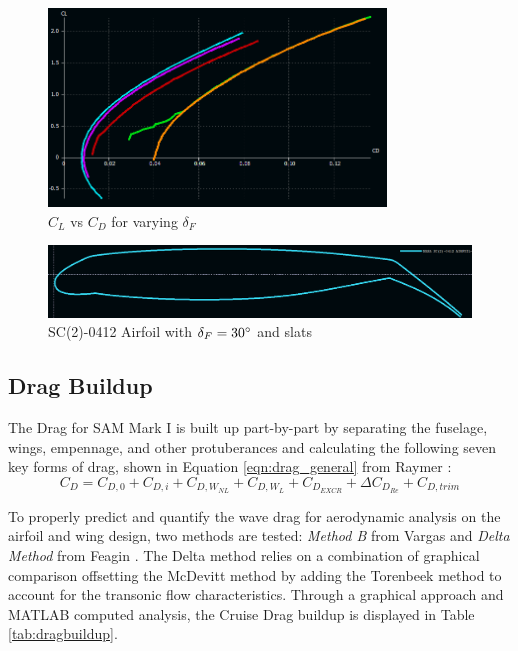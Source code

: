 \begin{figure}[!h]
    \centering
    \includegraphics[width=0.8\textwidth]{Photos/aero/CL_o_CD.png}
    \caption{$C_L$ vs $C_D$ for varying $\delta_F$}
    \label{fig:clcdhigh}
\end{figure}

\begin{figure}[!h]
    \centering
    \includegraphics[width=\textwidth]{Photos/aero/sc0412flapped.png}
    \caption{SC(2)-0412 Airfoil with $\delta_F = 30\degree$ and slats}
    \label{fig:highlift}
\end{figure}

\clearpage
\subsection{Drag Buildup}
The Drag for SAM Mark I is built up part-by-part by separating the fuselage, wings, empennage, and other protuberances and calculating the following seven key forms of drag, shown in Equation \ref{eqn:drag_general} from Raymer \cite{raymer}:
\begin{equation}\label{eqn:drag_general}
    C_D = C_{D,0} + C_{D,i} + C_{D,W_{NL}} + C_{D,W_{L}} + C_{D_{EXCR}} + \Delta C_{D_{Re}} + C_{D,trim}
\end{equation}




To properly predict and quantify the wave drag for aerodynamic analysis on the airfoil and wing design, two methods are tested: \textit{Method B} from Vargas \cite{vargas} and \textit{Delta Method} from Feagin \cite{deltaMethod}.  The Delta method relies on a combination of graphical comparison offsetting the McDevitt method \cite{mcdevitt} by adding the Torenbeek method \cite{torenbeek} to account for the transonic flow characteristics.  Through a graphical approach and MATLAB computed analysis, the Cruise Drag buildup is displayed in Table \ref{tab:dragbuildup}.

